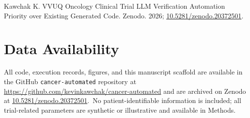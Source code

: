 Kawchak K. VVUQ Oncology Clinical Trial LLM Verification Automation Priority over Existing Generated Code. Zenodo. 2026;
\href{https://doi.org/10.5281/zenodo.20372501}{10.5281/zenodo.20372501}.

{}
\section*{Data Availability}
\label{sec:data}

All code, execution records, figures, and this manuscript scaffold are available
in the GitHub \texttt{cancer-automated} repository  at
\url{https://github.com/kevinkawchak/cancer-automated} and are archived on
Zenodo at \href{https://doi.org/10.5281/zenodo.20372501}{10.5281/zenodo.20372501}.\
No patient-identifiable information is included; all trial-related parameters are
synthetic or illustrative and available in Methods.









